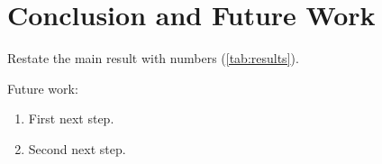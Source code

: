 \section{Conclusion and Future Work}
\label{sec:conclusion}

Restate the main result with numbers (\cref{tab:results}).

Future work:
\begin{enumerate}
  \item First next step.
  \item Second next step.
\end{enumerate}
